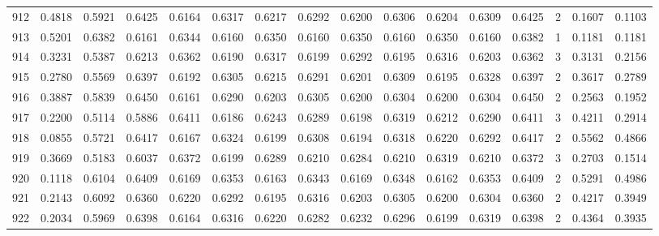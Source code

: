 \begin{tabular}{lrrrrrrrrrrrrrrr}
912 &      0.4818 &  0.5921 &  0.6425 &  0.6164 &  0.6317 &  0.6217 &  0.6292 &  0.6200 &  0.6306 &  0.6204 &   0.6309 &     0.6425 &      2 &                    0.1607 &                     0.1103 \\
913 &      0.5201 &  0.6382 &  0.6161 &  0.6344 &  0.6160 &  0.6350 &  0.6160 &  0.6350 &  0.6160 &  0.6350 &   0.6160 &     0.6382 &      1 &                    0.1181 &                     0.1181 \\
914 &      0.3231 &  0.5387 &  0.6213 &  0.6362 &  0.6190 &  0.6317 &  0.6199 &  0.6292 &  0.6195 &  0.6316 &   0.6203 &     0.6362 &      3 &                    0.3131 &                     0.2156 \\
915 &      0.2780 &  0.5569 &  0.6397 &  0.6192 &  0.6305 &  0.6215 &  0.6291 &  0.6201 &  0.6309 &  0.6195 &   0.6328 &     0.6397 &      2 &                    0.3617 &                     0.2789 \\
916 &      0.3887 &  0.5839 &  0.6450 &  0.6161 &  0.6290 &  0.6203 &  0.6305 &  0.6200 &  0.6304 &  0.6200 &   0.6304 &     0.6450 &      2 &                    0.2563 &                     0.1952 \\
917 &      0.2200 &  0.5114 &  0.5886 &  0.6411 &  0.6186 &  0.6243 &  0.6289 &  0.6198 &  0.6319 &  0.6212 &   0.6290 &     0.6411 &      3 &                    0.4211 &                     0.2914 \\
918 &      0.0855 &  0.5721 &  0.6417 &  0.6167 &  0.6324 &  0.6199 &  0.6308 &  0.6194 &  0.6318 &  0.6220 &   0.6292 &     0.6417 &      2 &                    0.5562 &                     0.4866 \\
919 &      0.3669 &  0.5183 &  0.6037 &  0.6372 &  0.6199 &  0.6289 &  0.6210 &  0.6284 &  0.6210 &  0.6319 &   0.6210 &     0.6372 &      3 &                    0.2703 &                     0.1514 \\
920 &      0.1118 &  0.6104 &  0.6409 &  0.6169 &  0.6353 &  0.6163 &  0.6343 &  0.6169 &  0.6348 &  0.6162 &   0.6353 &     0.6409 &      2 &                    0.5291 &                     0.4986 \\
921 &      0.2143 &  0.6092 &  0.6360 &  0.6220 &  0.6292 &  0.6195 &  0.6316 &  0.6203 &  0.6305 &  0.6200 &   0.6304 &     0.6360 &      2 &                    0.4217 &                     0.3949 \\
922 &      0.2034 &  0.5969 &  0.6398 &  0.6164 &  0.6316 &  0.6220 &  0.6282 &  0.6232 &  0.6296 &  0.6199 &   0.6319 &     0.6398 &      2 &                    0.4364 &                     0.3935 \\

\end{tabular}
